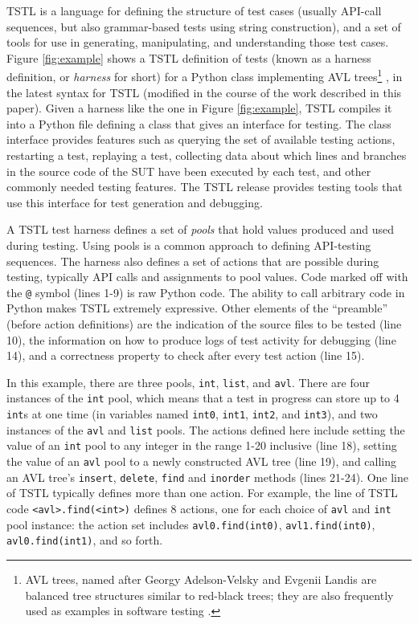 TSTL \cite{NFM15,ISSTA15,tstl} is a language for defining the
structure of test cases (usually API-call sequences, but also
grammar-based tests using string construction), and a set of tools for
use in generating, manipulating, and understanding those test cases.
Figure \ref{fig:example} shows a TSTL definition of tests (known as a
harness definition, or \emph{harness} for short) for a Python class
implementing AVL trees\footnote{AVL trees, named after Georgy
  Adelson-Velsky and Evgenii Landis \cite{AVL} are balanced tree
  structures similar to red-black trees; they are also frequently used as
  examples in software testing \cite{FASE,ISSRE}.} \cite{avltree}, in the latest syntax for TSTL (modified in the
course of the work described in this paper).  Given a harness like the
one in Figure \ref{fig:example}, TSTL compiles it into a Python file
defining a class that gives an interface for testing.  The class
interface provides features such as
querying the set of available testing actions, restarting a test,
replaying a test, collecting data about which lines and branches in
the source code of the SUT have been executed by each test, and other commonly
needed testing features.  The TSTL release \cite{tstl} provides
testing tools that use this interface for test generation and
debugging.

A TSTL test harness defines a set of \emph{pools} that hold values
produced and used during testing.   Using pools \cite{AndrewsTR} is a common
approach to defining API-testing sequences.  The harness also defines a set of
actions that are possible during testing, typically API calls and
assignments to pool values.  Code marked off with the {\tt @}
symbol (lines 1-9) is raw Python code.  The ability to call
arbitrary code in Python makes TSTL extremely expressive.  Other
elements of the ``preamble'' (before action definitions) are the
indication of the source files to be tested (line 10), the information
on how to produce logs of test activity for debugging (line 14), and a
correctness property to check after every test action (line 15).

In this example, there are three pools,
{\tt int}, {\tt list}, and {\tt avl}.  There are four instances of the
{\tt int} pool, which means that a test in progress can store up to 4
{\tt int}s at one time (in variables named {\tt int0}, {\tt int1},
{\tt int2}, and {\tt int3}), and two instances of the {\tt avl} and
{\tt list}
pools.  The actions defined here include setting the value of an {\tt int}
pool to any integer in the range 1-20 inclusive (line 18), setting the value of
an {\tt avl} pool to a newly constructed AVL tree (line 19), and calling an AVL
tree's {\tt insert}, {\tt delete}, {\tt find} and {\tt inorder}
methods (lines 21-24).  One line of TSTL typically defines more than one action. For
example, the line of TSTL code {\tt <avl>.find(<int>)} defines 8 actions, one
for each choice of {\tt avl} and {\tt int} pool instance:  the action set
includes {\tt avl0.find(int0)}, {\tt avl1.find(int0)}, {\tt
  avl0.find(int1)}, and so forth.  


